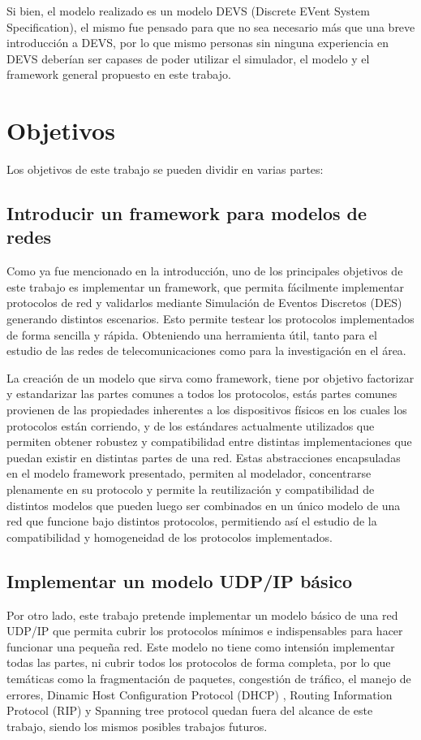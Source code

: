 \documentclass[10pt,a4paper]{article}
\begin{document}
Si bien, el modelo realizado es un modelo DEVS (Discrete EVent System Specification), el mismo fue pensado para que no sea necesario más que una breve introducción a DEVS, por lo que mismo personas sin ninguna experiencia en DEVS deberían ser capases de poder utilizar el simulador, el modelo y el framework general propuesto en este trabajo.

\section{Objetivos}

Los objetivos de este trabajo se pueden dividir en varias partes:
\subsection{Introducir un framework para modelos de redes}

Como ya fue mencionado en la introducción, uno de los principales objetivos de este trabajo es implementar un framework, que permita fácilmente implementar protocolos de red y validarlos mediante Simulación de Eventos Discretos (DES) generando distintos escenarios. Esto permite testear los protocolos implementados de forma sencilla y rápida. Obteniendo una herramienta útil, tanto para el estudio de las redes de telecomunicaciones como para la investigación en el área. 

La creación de un modelo que sirva como framework, tiene por objetivo factorizar y estandarizar las partes comunes a todos los protocolos, estás partes comunes provienen de las propiedades inherentes a los dispositivos físicos en los cuales los protocolos están corriendo, y de los estándares actualmente utilizados que permiten obtener robustez y compatibilidad entre distintas implementaciones que puedan existir en distintas partes de una red. Estas abstracciones encapsuladas en el modelo framework presentado, permiten al modelador, concentrarse plenamente en su protocolo y permite la reutilización y compatibilidad de distintos modelos que pueden luego ser combinados en un único modelo de una red que funcione bajo distintos protocolos, permitiendo así el estudio de la compatibilidad y homogeneidad de los protocolos implementados.

\subsection{Implementar un modelo UDP/IP básico}

Por otro lado, este trabajo pretende implementar un modelo básico de una red UDP/IP que permita cubrir los protocolos mínimos e indispensables para hacer funcionar una pequeña red. Este modelo no tiene como intensión implementar todas las partes, ni cubrir todos los protocolos de forma completa, por lo que temáticas como la fragmentación de paquetes, congestión de tráfico, el manejo de errores, Dinamic Host Configuration Protocol (DHCP) \cite[p.~231]{peterson2007computer}, Routing Information Protocol (RIP)\cite[p.~243]{peterson2007computer} y Spanning tree protocol \cite[p.~194]{peterson2007computer} quedan fuera del alcance de este trabajo, siendo los mismos posibles trabajos futuros.
\end{document}

